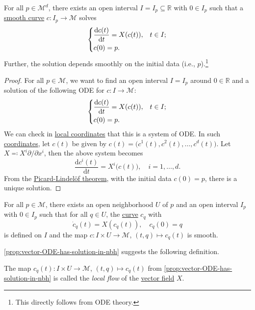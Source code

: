 \begin{proposition}\label{prop:vector-ODE-has-solution}
	For all \(p\in \mathcal{M} ^d\), there exists an open interval \(I = I_p \subseteq \mathbb{R} \) with \(0\in I_p\) such that a \hyperref[def:curve]{smooth curve} \(c\colon I_p \to \mathcal{M} \) solves
	\[
		\begin{dcases}
			\frac{\mathrm{d}c(t)}{\mathrm{d}t} = X(c(t)), & t\in I; \\
			c(0) = p.
		\end{dcases}
	\]
	Further, the solution depends smoothly on the initial data (i.e., \(p\)).\footnote{This directly follows from ODE theory.}
\end{proposition}
\begin{proof}
	For all \(p\in \mathcal{M} \), we want to find an open interval \(I = I_p\) around \(0\in \mathbb{R} \) and a solution of the following ODE for \(c\colon I \to \mathcal{M} \):
	\[
		\begin{dcases}
			\frac{\mathrm{d}c(t)}{\mathrm{d}t} = X(c(t)), & t\in I; \\
			c(0) = p.
		\end{dcases}
	\]
	We can check in \hyperref[def:coordinate-chart]{local coordinates} that this is a system of ODE. In such \hyperref[def:coordinate-chart]{coordinates}, let \(c(t)\) be given by \(c(t) = \big(c^1(t), c^2(t), \ldots , c^d(t)\big)\). Let \(X \eqqcolon X^i \partial / \partial x^i\), then the above system becomes
	\[
		\frac{\mathrm{d}c^i(t)}{\mathrm{d}t} = X^i\big(c(t)\big) ,\quad i = 1, \ldots , d.
	\]
	From the \href{https://en.wikipedia.org/wiki/Picard%E2%80%93Lindel%C3%B6f_theorem}{Picard-Lindelöf theorem}, with the initial data \(c(0)=p\), there is a unique solution.	
\end{proof}

\begin{proposition}\label{prop:vector-ODE-has-solution-in-nbh}
	For all \(p\in \mathcal{M} \), there exists an open neighborhood \(U\) of \(p\) and an open interval \(I_p\) with \(0\in I_p\) such that for all \(q\in U\), the \hyperref[def:curve]{curve} \(c_q\) with
	\[
		\dot{c}_q(t) = X(c_q(t)),\quad c_q(0) = q
	\]
	is defined on \(I\) and the map \(c\colon I \times U \to \mathcal{M} \), \((t, q) \mapsto c_q(t)\) is smooth.
\end{proposition}

\autoref{prop:vector-ODE-has-solution-in-nbh} suggests the following definition.

\begin{definition}\label{def:local-flow}
	The map \(c_q(t) \colon I\times U \to \mathcal{M} \), \((t, q)\mapsto c_q(t)\) from \autoref{prop:vector-ODE-has-solution-in-nbh} is called the \emph{local flow} of the \hyperref[def:vector-field]{vector field} \(X\).
\end{definition}


